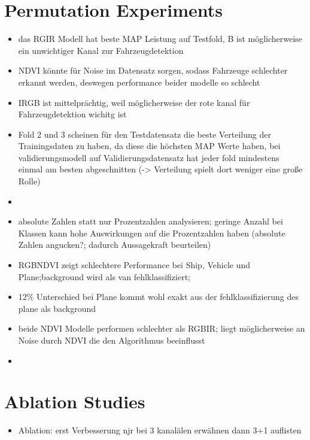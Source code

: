 \section*{Permutation Experiments}
\begin{itemize}
    \item das RGIR Modell hat beste MAP Leistung auf Testfold, B ist möglicherweise ein unwichtiger Kanal zur Fahrzeugdetektion
    \item NDVI könnte für Noise im Datensatz sorgen, sodass Fahrzeuge schlechter erkannt werden, deswegen performance beider modelle so schlecht
    \item IRGB ist mittelprächtig, weil möglicherweise der rote kanal für Fahrzeugdetektion wichitg ist 
    \item Fold 2 und 3 scheinen für den Testdatensatz die beste Verteilung der Trainingsdaten zu haben, da diese die höchsten MAP Werte haben, bei validierungsmodell auf Validierungsdatensatz hat jeder fold mindestens einmal am besten abgeschnitten (-> Verteilung spielt dort weniger eine große Rolle) 
\end{itemize}
\begin{itemize}
    \item {}
    \item absolute Zahlen statt nur Prozentzahlen analysieren; geringe Anzahl bei Klassen kann hohe Auswirkungen auf die Prozentzahlen haben (absolute Zahlen angucken?; dadurch Aussagekraft beurteilen)
\end{itemize}
\begin{itemize}
    \item \acrshort{RGBNDVI} zeigt schlechtere Performance bei Ship, Vehicle und Plane;background wird als van fehlklassifiziert; 
    \item 12\% Unterschied bei Plane kommt wohl exakt aus der fehlklassifizierung des plane als background
    \item beide NDVI Modelle performen schlechter als RGBIR; liegt möglicherweise an Noise durch NDVI die den Algorithmus beeinflusst
    \item 
\end{itemize}
\section*{Ablation Studies}
\begin{itemize}
    \item Ablation: erst Verbesserung njr bei 3 kanalälen erwähnen dann 3+1 auflisten
\end{itemize}
